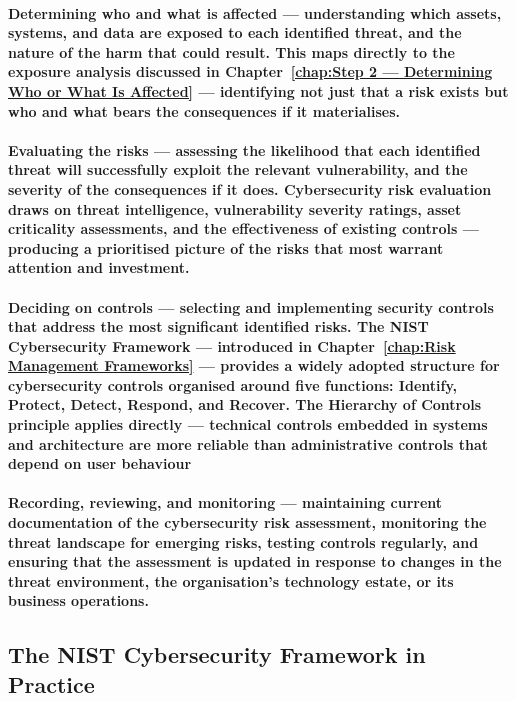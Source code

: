 \paragraph{\textbf{Determining who and what is affected} — understanding which assets, systems, and data are exposed to each identified threat, and the nature of the harm that could result. This maps directly to the exposure analysis discussed in Chapter~\ref{chap:Step 2 — Determining Who or What Is Affected} — identifying not just that a risk exists but who and what bears the consequences if it materialises.}
\paragraph{\textbf{Evaluating the risks} — assessing the likelihood that each identified threat will successfully exploit the relevant vulnerability, and the severity of the consequences if it does. Cybersecurity risk evaluation draws on threat intelligence, vulnerability severity ratings, asset criticality assessments, and the effectiveness of existing controls — producing a prioritised picture of the risks that most warrant attention and investment.}
\paragraph{\textbf{Deciding on controls} — selecting and implementing security controls that address the most significant identified risks. The \textbf{NIST Cybersecurity Framework} — introduced in Chapter~\ref{chap:Risk Management Frameworks} — provides a widely adopted structure for cybersecurity controls organised around five functions: \textbf{Identify, Protect, Detect, Respond, and Recover}. The Hierarchy of Controls principle applies directly — technical controls embedded in systems and architecture are more reliable than administrative controls that depend on user behaviour}
\paragraph{\textbf{Recording, reviewing, and monitoring} — maintaining current documentation of the cybersecurity risk assessment, monitoring the threat landscape for emerging risks, testing controls regularly, and ensuring that the assessment is updated in response to changes in the threat environment, the organisation's technology estate, or its business operations.}

\subsection{The NIST Cybersecurity Framework in Practice}
